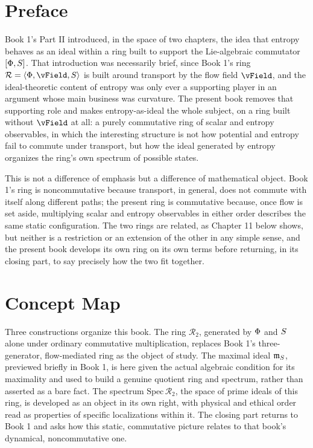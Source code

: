 \chapter*{Preface}

Book 1's Part II introduced, in the space of two chapters, the idea that entropy behaves as an ideal within a ring built to support the Lie-algebraic commutator $[\Phi, S]$. That introduction was necessarily brief, since Book 1's ring $\mathcal{R} = \langle \PhiField, \vField, \SEntropy \rangle$ is built around transport by the flow field $\vField$, and the ideal-theoretic content of entropy was only ever a supporting player in an argument whose main business was curvature. The present book removes that supporting role and makes entropy-as-ideal the whole subject, on a ring built without $\vField$ at all: a purely commutative ring of scalar and entropy observables, in which the interesting structure is not how potential and entropy fail to commute under transport, but how the ideal generated by entropy organizes the ring's own spectrum of possible states.

This is not a difference of emphasis but a difference of mathematical object. Book 1's ring is noncommutative because transport, in general, does not commute with itself along different paths; the present ring is commutative because, once flow is set aside, multiplying scalar and entropy observables in either order describes the same static configuration. The two rings are related, as Chapter 11 below shows, but neither is a restriction or an extension of the other in any simple sense, and the present book develops its own ring on its own terms before returning, in its closing part, to say precisely how the two fit together.

\chapter*{Concept Map}

Three constructions organize this book. The ring $\mathcal{R}_2$, generated by $\Phi$ and $S$ alone under ordinary commutative multiplication, replaces Book 1's three-generator, flow-mediated ring as the object of study. The maximal ideal $\mathfrak{m}_{S}$, previewed briefly in Book 1, is here given the actual algebraic condition for its maximality and used to build a genuine quotient ring and spectrum, rather than asserted as a bare fact. The spectrum $\mathrm{Spec}\,\mathcal{R}_2$, the space of prime ideals of this ring, is developed as an object in its own right, with physical and ethical order read as properties of specific localizations within it. The closing part returns to Book 1 and asks how this static, commutative picture relates to that book's dynamical, noncommutative one.

